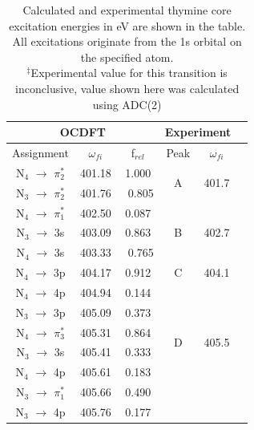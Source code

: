 \documentclass[12pt]{article}
\begin{document}
\begin{table}
\centering
    \begin{tabular}{c@{\hskip 0.22in}c@{\hskip 0.22in}c@{\hskip 0.52in}c@{\hskip 0.22in}c@{\hskip 0.22in}c}
    \hline
    \hline
  \multicolumn{3}{c}{OCDFT} &\multicolumn{2}{c}{Experiment} \\
  \hline
  Assignment & $\omega_{fi}$ & f$_{rel}$ & Peak &  $\omega_{fi}$   \\
  \hline
   N$_4$ $\rightarrow$ $\pi_2^*$ & 401.18 & 1.000 &  \multirow{2}{*}{A} &\multirow{2}{*}{401.7}\\
   N$_3$ $\rightarrow$ $\pi_2^*$ & 401.76 & \ 0.805
   \vspace{2mm}\\
   N$_4$ $\rightarrow$ $\pi_1^*$ & 402.50 & 0.087 & \multirow{3}{*}{B} & \multirow{3}{*}{402.7}\\
   N$_3$ $\rightarrow$ 3s & 403.09 & 0.863\\
   N$_4$ $\rightarrow$ 3s & 403.33 & \ 0.765 
   \vspace{2mm}\\
   N$_4$ $\rightarrow$ 3p & 404.17 & 0.912 & C & 404.1 
   \vspace{2mm}\\
   N$_4$ $\rightarrow$ 4p & 404.94 & 0.144 & \multirow{6}{*}{D} & \multirow{6}{*}{405.5}\\
   N$_3$ $\rightarrow$ 3p & 405.09 & 0.373\\
   N$_4$ $\rightarrow$ $\pi_3^*$ & 405.31 & 0.864\\
   N$_3$ $\rightarrow$ 3s & 405.41 & 0.333\\
   N$_4$ $\rightarrow$ 4p & 405.61 & 0.183\\
   N$_3$ $\rightarrow$ $\pi_1^*$& 405.66 & 0.490\\
   N$_3$ $\rightarrow$ 4p & 405.76 & 0.177\\
   \hline
  \end{tabular}
      \caption{Calculated and experimental thymine core excitation energies in eV are shown in the table. All excitations originate from the 1s orbital on the specified atom. \\
  $^{\ddagger}$Experimental value for this transition is inconclusive, value shown here was calculated using ADC(2)}
  \label{figure:MOs}
  \end{table}
\end{document}
